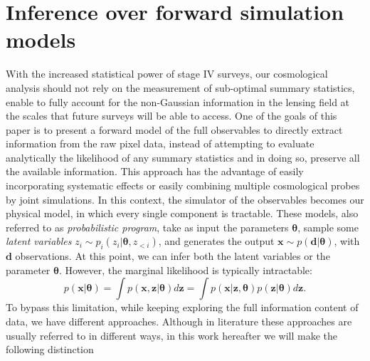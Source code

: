 \documentclass{aa}
\begin{document}
\section{Inference over forward simulation models}
With the increased statistical power of stage IV surveys, our cosmological analysis should not rely on the measurement of sub-optimal summary statistics, enable to fully account for the non-Gaussian information in the lensing field at
the scales that future surveys will be able to access. One of the goals of this paper is to present a forward model of the full observables to directly extract information from the raw pixel data, instead of attempting to evaluate analytically the likelihood of any summary statistics and in doing so, preserve all the available information. 
This approach has the advantage of easily incorporating systematic effects or easily combining multiple cosmological probes by joint simulations.  
In this context, the simulator of the observables becomes our physical model, in which every single component is tractable. These models, also referred to as \textit{probabilistic program}, take as input the parameters $\bm{\theta}$, sample some \textit{latent variables} $z_i \sim p_i(z_i|\bm \theta, z_{<i})$, and generates the output $\bm x \sim p(\bm d|\bm \theta)$, with $\bm{d}$ observations. At this point, we can infer both the latent variables or the parameter $\bm{\theta}$. However,  the marginal likelihood is typically intractable:
\begin{equation}
    p(\bm{x}|\bm{\theta})=\int p(\bm{x},\bm{z}|\bm{\theta}) d\bm{z}=\int p(\bm{x}|\bm{z},\bm{\theta})p(\bm{z}|\bm{\theta}) d\bm{z}.
\end{equation}
To bypass this limitation, while keeping exploring the full information content of data, we have different approaches. Although in literature these approaches are usually referred to in different ways, in this work hereafter we will make the following distinction 
\end{document}
